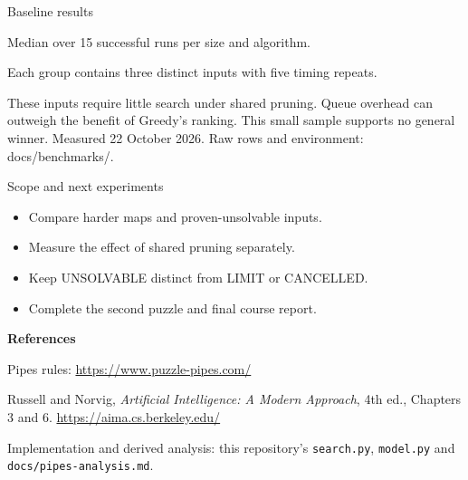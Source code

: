 \documentclass[aspectratio=169,11pt]{beamer}
\newcommand{\src}[1]{\vfill{\tiny\color{muted}#1}}
\begin{document}
\begin{frame}{Baseline results}

\vspace{3mm}
\small Median over 15 successful runs per size and algorithm.\par
Each group contains three distinct inputs with five timing repeats.\par\vspace{3mm}
These inputs require little search under shared pruning. Queue overhead can outweigh
the benefit of Greedy's ranking. This small sample supports no general winner.
\src{Measured 22 October 2026. Raw rows and environment: docs/benchmarks/.}
\end{frame}

\begin{frame}{Scope and next experiments}
\begin{itemize}
\item Compare harder maps and proven-unsolvable inputs.
\item Measure the effect of shared pruning separately.
\item Keep UNSOLVABLE distinct from LIMIT or CANCELLED.
\item Complete the second puzzle and final course report.
\end{itemize}
\vspace{5mm}
\small\textbf{References}\par\vspace{2mm}
Pipes rules: \url{https://www.puzzle-pipes.com/}\par
Russell and Norvig, \emph{Artificial Intelligence: A Modern Approach},
4th ed., Chapters 3 and 6. \url{https://aima.cs.berkeley.edu/}\par\vspace{2mm}
Implementation and derived analysis: this repository's
\texttt{search.py}, \texttt{model.py} and \texttt{docs/pipes-analysis.md}.
\end{frame}
\end{document}
